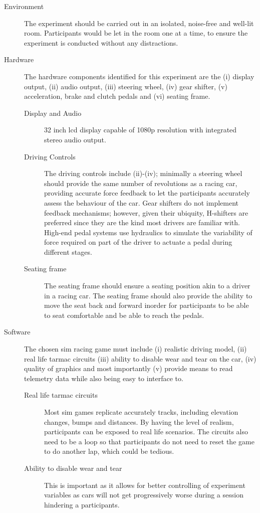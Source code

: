 \begin{description}
	\item [Environment] The experiment should be carried out in an isolated, noise-free and well-lit room. Participants would be let in the room one at a time, to ensure the experiment is conducted without any distractions.
	\item [Hardware] The hardware components identified for this experiment are the (i) display output, (ii) audio output, (iii) steering wheel, (iv) gear shifter, (v) acceleration, brake and clutch pedals and (vi) seating frame.
	\begin{description}
		\item [Display and Audio] 32 inch lcd display capable of 1080p resolution with integrated stereo audio output.
		\item [Driving Controls] The driving controls include (ii)-(iv); minimally a steering wheel should provide the same number of revolutions as a racing car, providing accurate force feedback to let the participants accurately assess the behaviour of the car. Gear shifters do not implement feedback mechanisms; however, given their ubiquity, H-shifters are preferred since they are the kind most drivers are familiar with. High-end pedal systems use hydraulics to simulate the variability of force required on part of the driver to actuate a pedal during different stages.
		\item [Seating frame] The seating frame should ensure a seating position akin to a driver in a racing car. The seating frame should also provide the ability to move the seat back and forward inorder for participants to be able to seat comfortable and be able to reach the pedals.
	\end{description}
	\item [Software] The chosen sim racing game must include (i) realistic driving model, (ii) real life tarmac circuits (iii) ability to disable wear and tear on the car, (iv) quality of graphics and most importantly (v) provide means to read telemetry data while also being easy to interface to.
	\begin{description}
		\item [Real life tarmac circuits] Most sim games replicate accurately tracks, including elevation changes, bumps and distances. By having the level of realism, participants can be exposed to real life scenarios. The circuits also need to be a loop so that participants do not need to reset the game to do another lap,  which could be tedious. 
		\item [Ability to disable wear and tear] This is important as it allows for better controlling of experiment variables as cars will not get progressively worse during a session hindering a participants.

\end{description}
\end{description}
